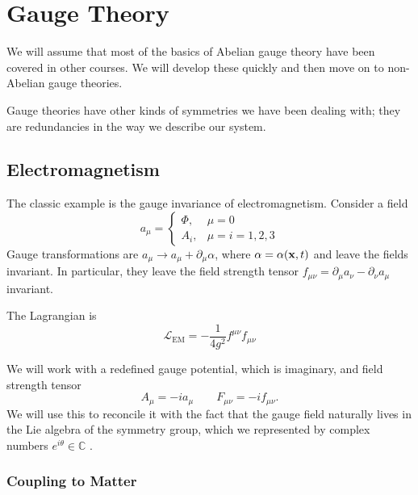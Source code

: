 \chapter{Gauge Theory}%
\label{cha:gauge_theory}

We will assume that most of the basics of Abelian gauge theory have been covered in other courses. We will develop these quickly and then move on to non-Abelian gauge theories.

Gauge theories have other kinds of symmetries we have been dealing with; they are redundancies in the way we describe our system.

\section{Electromagnetism}%
\label{sec:electromagnetism}

The classic example is the gauge invariance of electromagnetism. Consider a field
\begin{equation}
  a_{\mu} = 
  \begin{cases}
    \Phi, & \mu = 0 \\
    A_{i}, & \mu = i = 1, 2, 3
  \end{cases}
\end{equation}
Gauge transformations are $a_{\mu} \to a_{\mu} + \partial_{\mu} \alpha$, where $\alpha = \alpha(\vb{x}, t)$ and leave the fields invariant.
In particular, they leave the field strength tensor $f_{\mu\nu} = \partial_{\mu} a_{\nu} - \partial_{\nu} a_{\mu}$ invariant.

The Lagrangian is
\begin{equation}
  \mathcal{L}_{\text{EM}} = -\frac{1}{4 g^2} f^{\mu\nu} f_{\mu\nu}
\end{equation}

We will work with a redefined gauge potential, which is imaginary, and field strength tensor
\begin{equation}
  A_{\mu} = -i a_{\mu} \qquad F_{\mu\nu} = -i f_{\mu\nu}.
\end{equation}
We will use this to reconcile it with the fact that the gauge field naturally lives in the Lie algebra of the symmetry group, which we represented by complex numbers $e^{i \theta} \in \mathbb{C}$ .

\subsection{Coupling to Matter}%
\label{sub:coupling_to_matter}

